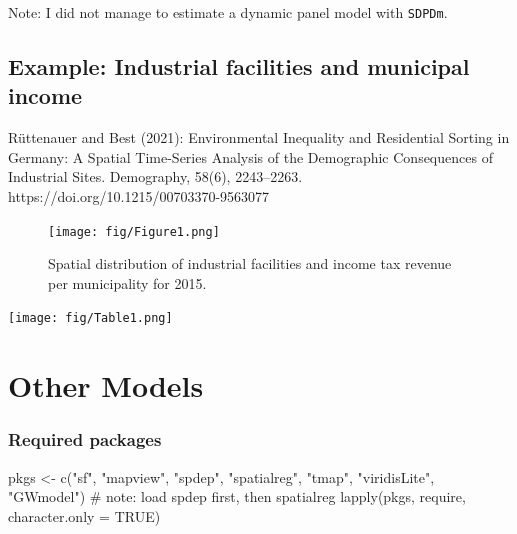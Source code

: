 \documentclass[
  letterpaper,
  DIV=11,
  numbers=noendperiod]{scrreprt}
\newenvironment{Shaded}{\begin{snugshade}}{\end{snugshade}}
\newcommand{\AttributeTok}[1]{\textcolor[rgb]{0.40,0.45,0.13}{#1}}
\newcommand{\CommentTok}[1]{\textcolor[rgb]{0.37,0.37,0.37}{#1}}
\newcommand{\ConstantTok}[1]{\textcolor[rgb]{0.56,0.35,0.01}{#1}}
\newcommand{\FunctionTok}[1]{\textcolor[rgb]{0.28,0.35,0.67}{#1}}
\newcommand{\NormalTok}[1]{\textcolor[rgb]{0.00,0.23,0.31}{#1}}
\newcommand{\OtherTok}[1]{\textcolor[rgb]{0.00,0.23,0.31}{#1}}
\newcommand{\StringTok}[1]{\textcolor[rgb]{0.13,0.47,0.30}{#1}}
\begin{document}
Note: I did not manage to estimate a dynamic panel model with
\texttt{SDPDm}.

\hypertarget{example-industrial-facilities-and-municipal-income}{%
\section{Example: Industrial facilities and municipal
income}\label{example-industrial-facilities-and-municipal-income}}

Rüttenauer and Best (2021): Environmental Inequality and Residential
Sorting in Germany: A Spatial Time-Series Analysis of the Demographic
Consequences of Industrial Sites. Demography, 58(6), 2243--2263.
https://doi.org/10.1215/00703370-9563077

\begin{figure}

{\centering \texttt{[image: fig/Figure1.png]}

}

\caption{Spatial distribution of industrial facilities and income tax
revenue per municipality for 2015.}

\end{figure}

\texttt{[image: fig/Table1.png]}


\hypertarget{other-models}{%
\chapter{Other Models}\label{other-models}}

\newcommand{\Exp}{\mathrm{E}}
\newcommand\given[1][]{\:#1\vert\:}
\newcommand{\Cov}{\mathrm{Cov}}
\newcommand{\Var}{\mathrm{Var}}
\newcommand{\rank}{\mathrm{rank}}
\newcommand{\bm}[1]{\boldsymbol{\mathbf{#1}}}
\newcommand{\Prob}{\mathrm{Prob}}

\hypertarget{required-packages-12}{%
\subsection{Required packages}\label{required-packages-12}}

\begin{Shaded}
\begin{Highlighting}[]
\NormalTok{pkgs }\OtherTok{\textless{}{-}} \FunctionTok{c}\NormalTok{(}\StringTok{"sf"}\NormalTok{, }\StringTok{"mapview"}\NormalTok{, }\StringTok{"spdep"}\NormalTok{, }\StringTok{"spatialreg"}\NormalTok{, }\StringTok{"tmap"}\NormalTok{, }\StringTok{"viridisLite"}\NormalTok{, }\StringTok{"GWmodel"}\NormalTok{) }\CommentTok{\# note: load spdep first, then spatialreg}
\FunctionTok{lapply}\NormalTok{(pkgs, require, }\AttributeTok{character.only =} \ConstantTok{TRUE}\NormalTok{)}
\end{Highlighting}
\end{Shaded}
\end{document}
